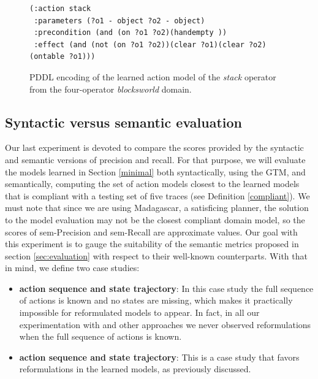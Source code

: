 \begin{figure}[hbt!]
	\begin{footnotesize}
		\begin{verbatim}
(:action stack
 :parameters (?o1 - object ?o2 - object)
 :precondition (and (on ?o1 ?o2)(handempty ))
 :effect (and (not (on ?o1 ?o2))(clear ?o1)(clear ?o2)(ontable ?o1)))
		\end{verbatim}
	\end{footnotesize}
	\caption{PDDL encoding of the learned action model of the {\em stack} operator from the four-operator {\em blocksworld} domain.}
	\label{fig:macroaction}
\end{figure}



\subsection{Syntactic versus semantic evaluation}
\label{semantic}

Our last experiment is devoted to compare the scores provided by the syntactic and semantic versions of precision and recall. For that purpose, we will evaluate the models learned in Section \ref{minimal} both syntactically, using the GTM, and semantically, computing the set of action models closest to the learned models that is compliant with a testing set of five traces (see Definition \ref{compliant}). We must note that since we are using {\sc Madagascar}, a satisficing planner, the solution to the model evaluation may not be the closest compliant domain model, so the scores of sem-Precision and sem-Recall are approximate values. Our goal with this experiment is to gauge the suitability of the semantic metrics proposed in section \ref{sec:evaluation} with respect to their well-known counterparts. With that in mind, we define two case studies:

\begin{itemize}
	\item \textbf{\FO action sequence and \PO state trajectory}: In this case study the full sequence of actions is known and no states are missing, which makes it practically impossible for reformulated models to appear. In fact, in all our experimentation with \FAMA and other approaches we never observed reformulations when the full sequence of actions is known.
	\item  \textbf{\NO action sequence and \NO state trajectory}: This is a case study that favors reformulations in the learned models, as previously discussed.
\end{itemize}

